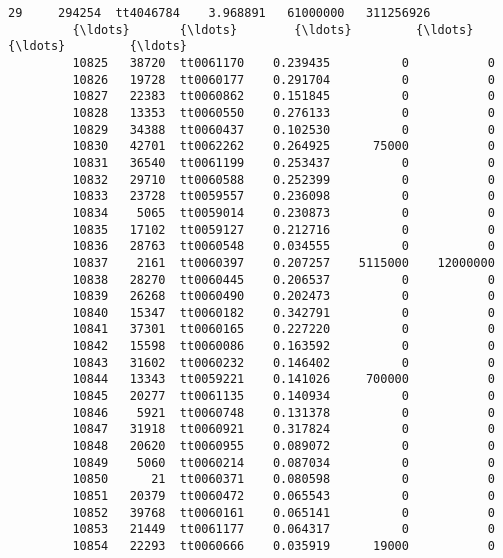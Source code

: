 \documentclass[11pt]{article}
\begin{document}
\begin{Verbatim}[commandchars=\\\{\}]
         29     294254  tt4046784    3.968891   61000000   311256926   
         {\ldots}       {\ldots}        {\ldots}         {\ldots}        {\ldots}         {\ldots}   
         10825   38720  tt0061170    0.239435          0           0   
         10826   19728  tt0060177    0.291704          0           0   
         10827   22383  tt0060862    0.151845          0           0   
         10828   13353  tt0060550    0.276133          0           0   
         10829   34388  tt0060437    0.102530          0           0   
         10830   42701  tt0062262    0.264925      75000           0   
         10831   36540  tt0061199    0.253437          0           0   
         10832   29710  tt0060588    0.252399          0           0   
         10833   23728  tt0059557    0.236098          0           0   
         10834    5065  tt0059014    0.230873          0           0   
         10835   17102  tt0059127    0.212716          0           0   
         10836   28763  tt0060548    0.034555          0           0   
         10837    2161  tt0060397    0.207257    5115000    12000000   
         10838   28270  tt0060445    0.206537          0           0   
         10839   26268  tt0060490    0.202473          0           0   
         10840   15347  tt0060182    0.342791          0           0   
         10841   37301  tt0060165    0.227220          0           0   
         10842   15598  tt0060086    0.163592          0           0   
         10843   31602  tt0060232    0.146402          0           0   
         10844   13343  tt0059221    0.141026     700000           0   
         10845   20277  tt0061135    0.140934          0           0   
         10846    5921  tt0060748    0.131378          0           0   
         10847   31918  tt0060921    0.317824          0           0   
         10848   20620  tt0060955    0.089072          0           0   
         10849    5060  tt0060214    0.087034          0           0   
         10850      21  tt0060371    0.080598          0           0   
         10851   20379  tt0060472    0.065543          0           0   
         10852   39768  tt0060161    0.065141          0           0   
         10853   21449  tt0061177    0.064317          0           0   
         10854   22293  tt0060666    0.035919      19000           0   
         

\end{Verbatim}
\end{document}
